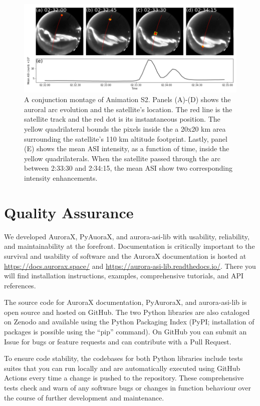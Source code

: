 \documentclass[utf8]{FrontiersinHarvard} %
\begin{document}
\begin{figure}
      \includegraphics[width=\textwidth]{figures/fig4.png}
      \caption{A conjunction montage of Animation S2. Panels (A)-(D) shows the auroral arc evolution and the satellite's location. The red line is the satellite track and the red dot is its instantaneous position. The yellow quadrilateral bounds the pixels inside the a 20x20 km area surrounding the satellite's 110 km altitude footprint. Lastly, panel (E) shows the mean ASI intensity, as a function of time, inside the yellow quadrilaterals. When the satellite passed through the arc between 2:33:30 and 2:34:15, the mean ASI show two corresponding intensity enhancements.}
      \label{fig4}
\end{figure}

\section{Quality Assurance}
We developed AuroraX, PyAuoraX, and aurora-asi-lib with usability, reliability, and maintainability at the forefront. Documentation is critically important to the survival and usability of software and the AuroraX documentation is hosted at \url{https://docs.aurorax.space/} and \url{https://aurora-asi-lib.readthedocs.io/}. There you will find installation instructions, examples, comprehensive tutorials, and API references.

The source code for AuroraX documentation, PyAuroraX, and aurora-asi-lib is open source and hosted on GitHub. The two Python libraries are also cataloged on Zenodo and available using the Python Packaging Index (PyPI; installation of packages is possible using the “pip” command). On GitHub you can submit an Issue for bugs or feature requests and can contribute with a Pull Request.  

To ensure code stability, the codebases for both Python libraries include tests suites that you can run locally and are automatically executed using GitHub Actions every time a change is pushed to the repository. These comprehensive tests check and warn of any software bugs or changes in function behaviour over the course of further development and maintenance.
\end{document}
